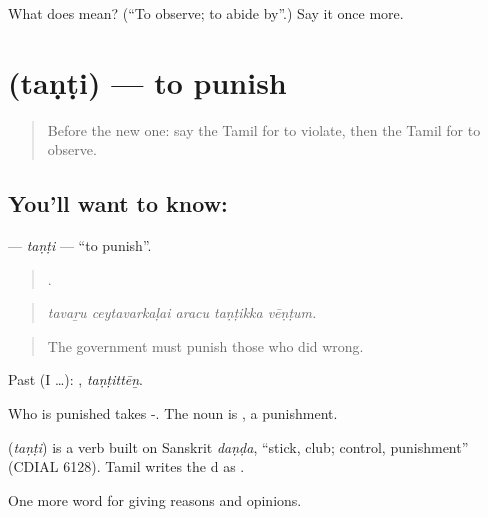 \begin{tcolorbox}[breakable,colback=teal!4,colframe=teal!35!black,title={Before you move on}]
What does  mean? (\textquotedblleft{}To observe; to abide by\textquotedblright{}.) Say it once more.
\end{tcolorbox}
\section[\texorpdfstring{\ta{தண்டி} (taṇṭi)}{தண்டி (taṇṭi)}]{ (taṇṭi) — to punish}

\label{lesson:TA-C372-tanti}



\begin{quote}
Before the new one: say the Tamil for to violate, then the Tamil for to observe.
\end{quote}

\subsection*{You'll want to know: }
\textbf{} — \emph{taṇṭi} — \textquotedblleft{}to punish\textquotedblright{}.

\begin{quote}
    .
\end{quote}

\begin{quote}
\emph{tavaṟu ceytavarkaḷai aracu taṇṭikka vēṇṭum.}
\end{quote}

\begin{quote}
The government must punish those who did wrong.
\end{quote}

Past (I …): , \emph{taṇṭittēṉ}.

Who is punished takes -. The noun is , a punishment.

\begin{cousinweb}
\textbf{} (\emph{taṇṭi}) is a verb built on Sanskrit \emph{daṇḍa}, \textquotedblleft{}stick, club; control, punishment\textquotedblright{} (CDIAL 6128). Tamil writes the d as .
\end{cousinweb}

\begin{grammarlens}[title={What you've built}]
One more word for giving reasons and opinions.
\end{grammarlens}

